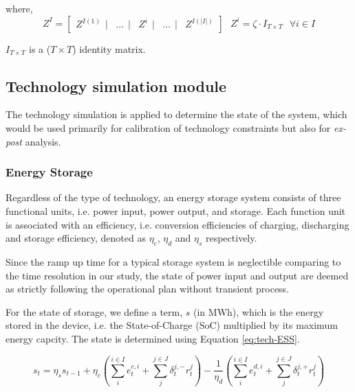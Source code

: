 where,
\begin{equation*}
Z^I = \begin{bmatrix}
Z^{I(1)}~~|&\dots~~|&Z^i~~|&\dots~~|&Z^{I(|I|)}
\end{bmatrix}~~~
Z^i = \zeta \cdot I_{T\times T} ~~~ \forall i \in I
\end{equation*}

$I_{T \times T}$ is a ($T \times T$) identity matrix. 

\subsection{Technology simulation module}
The technology simulation is applied to determine the state of the system, which would be used primarily for calibration of technology constraints but also for \textit{ex-post} analysis.

\subsubsection{Energy Storage}
Regardless of the type of technology, an energy storage system consists of three functional units, i.e. power input, power output, and storage. Each function unit is associated with an efficiency, i.e. conversion efficiencies of charging, discharging and storage efficiency, denoted as $\eta_c$, $\eta_d$ and $\eta_s$ respectively.

Since the ramp up time for a typical storage system is neglectible comparing to the time resolution in our study, the state of power input and output are deemed as strictly following the operational plan without transient process.

For the state of storage, we define a term, $s$ (in MWh), which is the energy stored in the device, i.e. the State-of-Charge (SoC) multiplied by its maximum energy capcity. The state is determined using Equation \ref{eq:tech-ESS}.

\begin{equation}
\label{eq:tech-ESS}
s_t = \eta_s s_{t-1} + \eta_c (\sum_{i}^{i \in I} e_t^{c,i} + \sum_{j}^{j \in J}\delta_t^{j,-}r_t^j)- \frac{1}{\eta_d} (\sum_{i}^{i \in I} e_t^{d,i} + \sum_{j}^{j \in J}\delta_t^{j,+}r_t^j)
\end{equation} 

